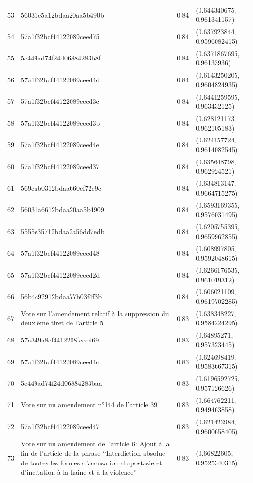\begin{table}[ht]
\begin{tabular}{rlrl}
  53 & 56031c5a12bdaa20aa5b490b & 0.84 & (0.644340675, 0.961341157) \\ 
  54 & 57a1f32bcf44122089ceed75 & 0.84 & (0.637923844, 0.9596082415) \\ 
  55 & 5c449ad74f24d06884283b8f & 0.84 & (0.6371867695, 0.96133936) \\ 
  56 & 57a1f32bcf44122089ceed4d & 0.84 & (0.6143250205, 0.9604824935) \\ 
  57 & 57a1f32bcf44122089ceed3c & 0.84 & (0.6441259595, 0.963432125) \\ 
  58 & 57a1f32bcf44122089ceed3b & 0.84 & (0.628121173, 0.962105183) \\ 
  59 & 57a1f32bcf44122089ceed4e & 0.84 & (0.624157724, 0.9614082545) \\ 
  60 & 57a1f32bcf44122089ceed37 & 0.84 & (0.635648798, 0.962924521) \\ 
  61 & 569cab0312bdaa660cf72c9c & 0.84 & (0.634813147, 0.9664715275) \\ 
  62 & 56031a6612bdaa20aa5b4909 & 0.84 & (0.6593169355, 0.9576031495) \\ 
  63 & 5555e35712bdaa2a56dd7edb & 0.84 & (0.6205755395, 0.9659962855) \\ 
  64 & 57a1f32bcf44122089ceed48 & 0.84 & (0.608997805, 0.9592048615) \\ 
  65 & 57a1f32bcf44122089ceed2d & 0.84 & (0.6266176535, 0.961019312) \\ 
  66 & 56b4c92912bdaa77b03f4f3b & 0.84 & (0.606021109, 0.9619702285) \\ 
  67 & Vote sur l'amendement relatif à la suppression du deuxième tiret de l'article 5 & 0.83 & (0.638348227, 0.9584224295) \\ 
  68 & 57a349a8cf4412208fceed69 & 0.83 & (0.64895271, 0.957323445) \\ 
  69 & 57a1f32bcf44122089ceed4c & 0.83 & (0.624698419, 0.9583667315) \\ 
  70 & 5c449ad74f24d06884283baa & 0.83 & (0.6196592725, 0.957126626) \\ 
  71 & Vote sur un amendement n°144 de l'article 39 & 0.83 & (0.664762211, 0.949463858) \\ 
  72 & 57a1f32bcf44122089ceed47 & 0.83 & (0.621423984, 0.9600658405) \\ 
  73 & Vote sur un amendement de l'article 6: Ajout à la fin de l’article de la phrase “Interdiction absolue de toutes les formes d'accusation d'apostasie et d’incitation à la haine et à la violence” & 0.83 & (0.66822605, 0.9525340315) \\ 

\end{tabular}
\end{table}
